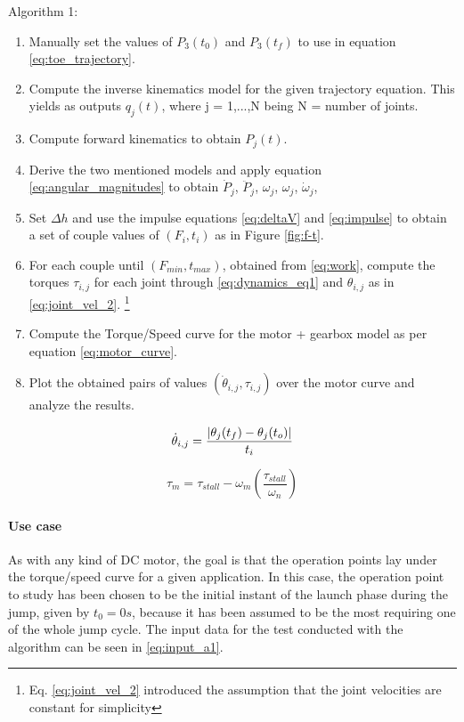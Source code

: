 Algorithm 1:
\begin{enumerate}
\label{list:algorithm_1}
\item Manually set the values of $P_{3}(t_{0})$ and $P_{3}(t_{f})$ to use in equation \ref{eq:toe_trajectory}.
\item Compute the inverse kinematics model for the given trajectory equation. This yields as outputs $q_{j}(t)$, where j = 1,...,N being N = number of joints.
\item Compute forward kinematics to obtain $P_{j}(t)$.
\item Derive the two mentioned models and apply equation \ref{eq:angular_magnitudes} to obtain $\dot{P}_{j}$, $\ddot{P}_{j}$, $\omega_{j}$, $\omega_{j}$, $\dot{\omega}_{j}$,
\item Set $\Delta h$ and use the impulse equations \ref{eq:deltaV} and \ref{eq:impulse} to obtain a set of couple values of $(F_{i}, t_{i})$ as in Figure \ref{fig:f-t}.
\item For each couple until $(F_{min}, t_{max})$, obtained from \ref{eq:work}, compute the torques $\tau_{i,j}$ for each joint through \ref{eq:dynamics_eq1} and $\theta_{i,j}$ as in \ref{eq:joint_vel_2}. \footnote{Eq. \ref{eq:joint_vel_2} introduced the assumption that the joint velocities are constant for simplicity}
\item Compute the Torque/Speed curve for the motor + gearbox model as per equation \ref{eq:motor_curve}.
\item Plot the obtained pairs of values $(\dot{\theta}_{i,j}, \tau_{i,j})$ over the motor curve and analyze the results.
\end{enumerate}

\begin{equation}
\label{eq:joint_vel_2}
	\dot{\theta}_{i,j} =\frac{ \lvert \theta_{j}(t_{f}) - \theta_{j}(t_{o}) \rvert }{ t_{i} }
\end{equation}

\begin{equation}
\label{eq:motor_curve}
	\tau_{m} = \tau_{stall} - \omega_{m}\left(\frac{\tau_{stall}}{\omega_{n}}\right)
\end{equation}

\paragraph{Use case} %
\label{par:example_of_use}
As with any kind of DC motor, the goal is that the operation points lay under the torque/speed curve for a given application.
In this case, the operation point to study has been chosen to be the initial instant of the launch phase during the jump, given by $t_{0}=0s$, because it has been assumed to be the most requiring one of the whole jump cycle.
The input data for the test conducted with the algorithm can be seen in \ref{eq:input_a1}.

